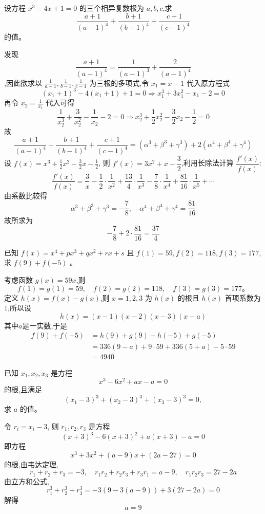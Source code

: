 \begin{questions}
    \question 设方程 $x^{3}-4x+1=0$ 的三个相异复数根为 $a, b, c$,求 
    $$\frac{a+1}{(a-1)^{4}}+\frac{b+1}{(b-1)^{4}}+\frac{c+1}{(c-1)^{4}}$$ 的值。
    \begin{solution}
        发现
        \[\frac{a+1}{(a-1)^4} = \frac{1}{(a-1)^3} + \frac{2}{(a-1)^4}
        \],因此欲求以 $\displaystyle \frac{1}{a-1}, \frac{1}{b-1}, \frac{1}{c-1}$ 为三根的多项式,令 $x_1 = x - 1 $ 代入原方程式
        \[
        (x_1+1)^3 - 4(x_1+1) + 1 = 0 \Rightarrow x_1^3 + 3x_1^2 - x_1 - 2 = 0
        \]
        再令 $x_2 = \frac{1}{x_1}$ 代入可得
        \[
        \frac{1}{x_2^3} + \frac{3}{x_2^2} - \frac{1}{x_2} - 2 = 0 \Rightarrow x^3_2 + \frac12 x^2_2 - \frac32 x_2 - \frac12 = 0
        \]
        故
        \[
        \frac{a+1}{(a-1)^4} + \frac{b+1}{(b-1)^4} + \frac{c+1}{(c-1)^4}
        = (\alpha^3 + \beta^3 + \gamma^3) + 2(\alpha^4 + \beta^4 + \gamma^4) \tag{1}
        \]
        设 $\displaystyle f(x) = x^3 + \frac12 x^2 - \frac32 x - \frac12$, 则 $ f'(x) = 3x^2 + x - \dfrac32$,利用长除法计算 $\dfrac{f'(x)}{f(x)}$:
        \[
        \frac{f'(x)}{f(x)} = \frac{3}{x} - \frac12 \cdot \frac{1}{x^2} + \frac{13}{4} \cdot \frac{1}{x^3}
        - \frac{7}{8} \cdot \frac{1}{x^4} + \frac{81}{16} \cdot \frac{1}{x^5} + \cdots
        \]
        由系数比较得
        \[
        \alpha^3 + \beta^3 + \gamma^3 = -\frac78,\quad
        \alpha^4 + \beta^4 + \gamma^4 = \frac{81}{16}
        \]
        故所求为
        \[
        -\frac78 + 2 \cdot \frac{81}{16} = \frac{37}{4}
        \]
    \end{solution}

    \question 已知 $f(x) = x^4 + px^3 + qx^2 + rx + s$ 且 $f(1)=59,f(2)=118,f(3)=177$,求 $f(9)+f(-5)$ 。
    \begin{solution}
        考虑函数 $g(x) = 59x$,则
        \[
        f(1)=g(1)=59,\quad f(2)=g(2)=118,\quad f(3)=g(3)=177。
        \]
        定义 $h(x) = f(x)-g(x)$,则 $x=1,2,3$ 为 $h(x)$ 的根且 $h(x)$ 首项系数为 $1$,所以设
        \[
        h(x) = (x-1)(x-2)(x-3)(x-a)
        \]
        其中$a$是一实数,于是
        \begin{align*}
        f(9)+f(-5) &= h(9)+g(9) + h(-5)+g(-5) \\
        &= 336(9-a) + 9\cdot 59 + 336(5+a) - 5\cdot 59 \\
        &= 4940
        \end{align*}
    \end{solution}

    \question 已知 $x_1, x_2, x_3$ 是方程
    \[
    x^3 - 6x^2 + a x - a = 0
    \]
    的根,且满足
    \[
    (x_1 - 3)^3 + (x_2 - 3)^3 + (x_3 - 3)^3 = 0,
    \]
    求 $a$ 的值。
    \begin{solution}
        令 $r_i = x_i - 3$, 则 $r_1, r_2, r_3$ 是方程
        \[
        (x+3)^3 - 6(x+3)^2 + a(x+3) - a = 0
        \]
        即方程
        \[
        x^3 + 3x^2 + (a-9)x + (2a-27) = 0
        \]
        的根,由韦达定理,
        \[
        r_1 + r_2 + r_3 = -3, \quad r_1r_2 + r_2r_3 + r_3r_1 = a-9, \quad r_1r_2r_3 = 27-2a
        \]
        由立方和公式,
        \[
        r_1^3 + r_2^3 + r_3^3 = -3(9 - 3(a-9)) + 3(27 - 2a) = 0
        \]
        解得
        \[
        a = 9
        \]
    \end{solution}


\end{questions}
